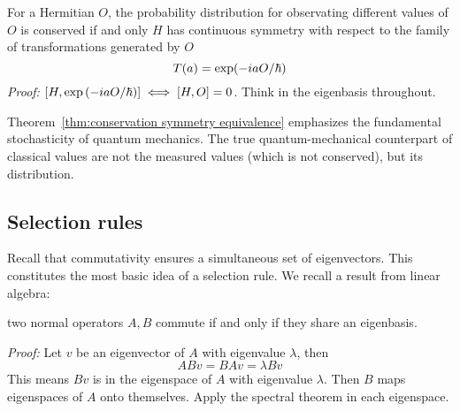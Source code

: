 \begin{theorem} \label{thm:conservation symmetry equivalence}
    For a Hermitian $O$, the probability distribution for observating different values of $O$ 
    is conserved if and only $H$ has continuous symmetry with respect to the family of transformations 
    generated by $O$
    \[ 
        T(a)=\exp(-ia O /\hbar)
    \] 
    \textit{Proof:} $[H, \exp\left(-i aO/\hbar\right)]\iff [H, O]=0$. Think in the eigenbasis throughout. 
\end{theorem}
\begin{remark}
    Theorem~\ref{thm:conservation symmetry equivalence} emphasizes the fundamental stochasticity 
    of quantum mechanics. The true quantum-mechanical counterpart of classical values are not the 
    measured values (which is not conserved), but its distribution. 
\end{remark}



\subsection{Selection rules}
Recall that commutativity ensures a simultaneous set of eigenvectors. This constitutes the most 
basic idea of a selection rule. We recall a result from linear algebra: 
\begin{theorem}
    two normal operators $A, B$ commute if and only if they share an eigenbasis. 

    \textit{Proof:} Let $v$ be an eigenvector of $A$ with eigenvalue $\lambda$, then 
    \[ 
        ABv = BAv = \lambda B v
    \] 
    This means $Bv$ is in the eigenspace of $A$ with eigenvalue $\lambda$. 
    Then $B$ maps eigenspaces of $A$ onto themselves. 
    Apply the spectral theorem in each eigenspace. 
\end{theorem}

